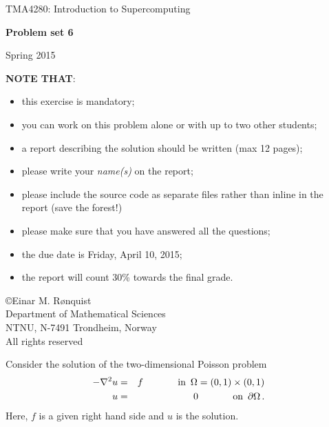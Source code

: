 \documentclass[11pt]{article}
\begin{document}
 
\LARGE
\begin{center}
TMA4280: Introduction to Supercomputing
\end{center}
\vspace{0.5in}

\begin{center}
{\bf Problem set 6}
\end{center}

\Large
\vspace{0.5in}
\begin{center}
Spring 2015
\end{center}

\vspace{0.5in}

{\bf NOTE THAT}:
\begin{itemize}
\item this exercise is mandatory;
\item you can work on this problem alone or with up to two other students;
\item a report describing the solution should be written (max 12 pages);
\item please write your \emph{name(s)} on the report; 
\item please include the source code as separate files rather than inline in the report (save the forest!)
\item please make sure that you have answered all the questions; 
\item the due date is Friday, April 10, 2015;
\item the report will count 30\% towards the final grade.
\end{itemize}

\vspace{0.5in}

\begin{center}
\copyright Einar M. R{\o}nquist \\
Department of Mathematical Sciences\\
NTNU, N-7491 Trondheim, Norway\\
All rights reserved
\end{center}

\large

\newpage


Consider the solution of the two-dimensional Poisson problem
\begin{eqnarray}
-\nabla^2 u & = & f \hspace{.5in} \textrm{in} \,\,\, \Omega = (0,1)\times (0,1) \\
u & = & 0 \hspace{.5in} \textrm{on} \,\,\, \partial\Omega\, .
\end{eqnarray}
Here, $f$ is a given right hand side and $u$ is the solution.
\end{document}
